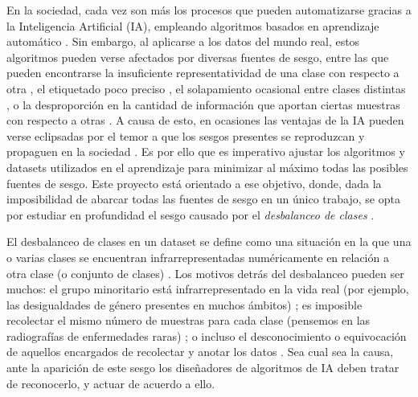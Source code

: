 En la sociedad, cada vez son más los procesos que pueden automatizarse gracias a la Inteligencia Artificial (IA), empleando algoritmos basados en aprendizaje automático \cite{vallimeena2019cnn}. Sin embargo, al aplicarse a los datos del mundo real, estos algoritmos pueden verse afectados por diversas fuentes de sesgo, entre las que pueden encontrarse la insuficiente representatividad de una clase con respecto a otra \cite{vluymans2019dealing}, el etiquetado poco preciso \cite{kafkalias2022bias}, el solapamiento ocasional entre clases distintas \cite{aka2021measuring}, o la desproporción en la cantidad de información que aportan ciertas muestras con respecto a otras \cite{li2019learning}. A causa de esto, en ocasiones las ventajas de la IA pueden verse eclipsadas por el temor a que los sesgos presentes se reproduzcan y propaguen en la sociedad \cite{nelson2019bias}. Es por ello que es imperativo ajustar los algoritmos y datasets utilizados en el aprendizaje para minimizar al máximo todas las posibles fuentes de sesgo. Este proyecto está orientado a ese objetivo, donde, dada la imposibilidad de abarcar todas las fuentes de sesgo en un único trabajo, se opta por estudiar en profundidad el sesgo causado por el \textit{desbalanceo de clases} \cite{liu2017fuzzy}.

El desbalanceo de clases en un dataset se define como una situación en la que una o varias clases se encuentran infrarrepresentadas numéricamente en relación a otra clase (o conjunto de clases) \cite{johnson2019survey}. Los motivos detrás del desbalanceo pueden ser muchos: el grupo minoritario está infrarrepresentado en la vida real (por ejemplo, las desigualdades de género presentes en muchos ámbitos) \cite{tianyu2018human}; es imposible recolectar el mismo número de muestras para cada clase (pensemos en las radiografías de enfermedades raras) \cite{rahimzadeh2020modified}; o incluso el desconocimiento o equivocación de aquellos encargados de recolectar y anotar los datos \cite{kafkalias2022bias}. Sea cual sea la causa, ante la aparición de este sesgo los diseñadores de algoritmos de IA deben tratar de reconocerlo, y actuar de acuerdo a ello.

